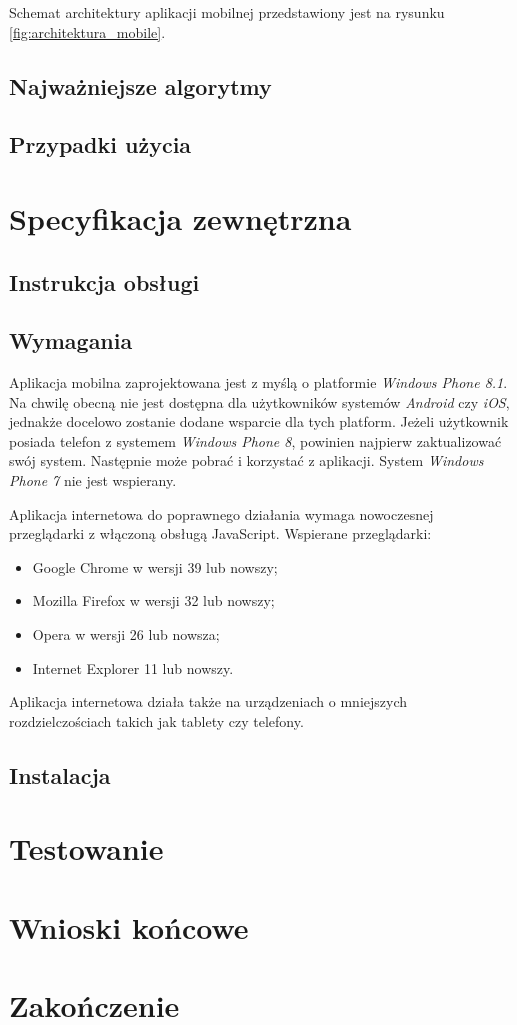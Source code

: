 \documentclass{book}
\begin{document}
			Schemat architektury aplikacji mobilnej przedstawiony jest na rysunku \ref{fig:architektura_mobile}. 
			
		
		\section{Najważniejsze algorytmy}
		\section{Przypadki użycia}
		
		
	\chapter{Specyfikacja zewnętrzna}
		\section{Instrukcja obsługi}
		\section{Wymagania}
		
		Aplikacja mobilna zaprojektowana jest z myślą o platformie \emph{Windows Phone 8.1}. Na chwilę obecną nie jest dostępna dla użytkowników systemów \emph{Android} czy \emph{iOS}, jednakże docelowo zostanie dodane wsparcie dla tych platform. Jeżeli użytkownik posiada telefon z systemem \emph{Windows Phone 8}, powinien najpierw zaktualizować swój system. Następnie może pobrać i korzystać z aplikacji. System \emph{Windows Phone 7} nie jest wspierany.
		
		Aplikacja internetowa do poprawnego działania wymaga nowoczesnej przeglądarki z włączoną obsługą JavaScript. Wspierane przeglądarki:
		\begin{itemize}
			\item Google Chrome w wersji 39 lub nowszy;
			\item Mozilla Firefox w wersji 32 lub nowszy;
			\item Opera w wersji 26 lub nowsza;
			\item Internet Explorer 11 lub nowszy.
		\end{itemize}
		
		Aplikacja internetowa działa także na urządzeniach o mniejszych rozdzielczościach takich jak tablety czy telefony.
		
		\section{Instalacja}
		
	\chapter{Testowanie}
	
	\chapter{Wnioski końcowe}
	
	\chapter{Zakończenie}
	
	
	
	
	
\end{document}
